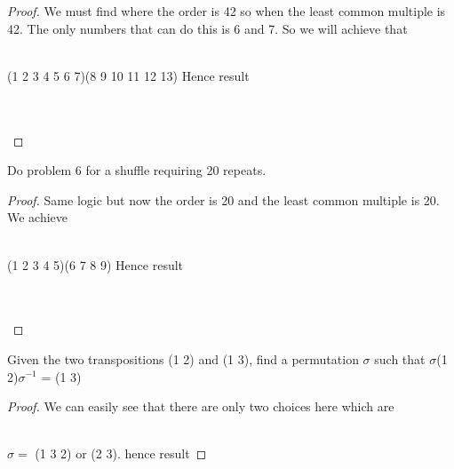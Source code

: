 \documentclass[12pt]{article}
\newenvironment{problem}[2][Problem]{\begin{trivlist}
\item[\hskip \labelsep {\bfseries #1}\hskip \labelsep {\bfseries #2.}]}{\end{trivlist}}
\begin{document}
\begin{proof} 
We must find where the order is 42 so when the least common multiple is 42. The only numbers that can do this is 6 and 7. So we will achieve that \\ \\
\centerline{(1 2 3 4 5 6 7)(8 9 10 11 12 13) Hence result} \\ \\

\end{proof}

\begin{problem}{3.2.7}
Do problem 6 for a shuffle requiring 20 repeats.
\end{problem}

\begin{proof}
Same logic but now the order is 20 and the least common multiple is 20. We achieve \\ \\
\centerline{(1 2 3 4 5)(6 7 8 9) Hence result} \\ \\
\end{proof}

\begin{problem}{3.2.9}
Given the two transpositions (1 2) and (1 3), find a permutation $\sigma$ such that $\sigma$(1 2)$\sigma^{-1}$ = (1 3)
\end{problem}

\begin{proof}
We can easily see that there are only two choices here which are \\ \\
\centerline{$\sigma =$ (1 3 2) or (2 3). hence result}
\end{proof}

\end{document}
